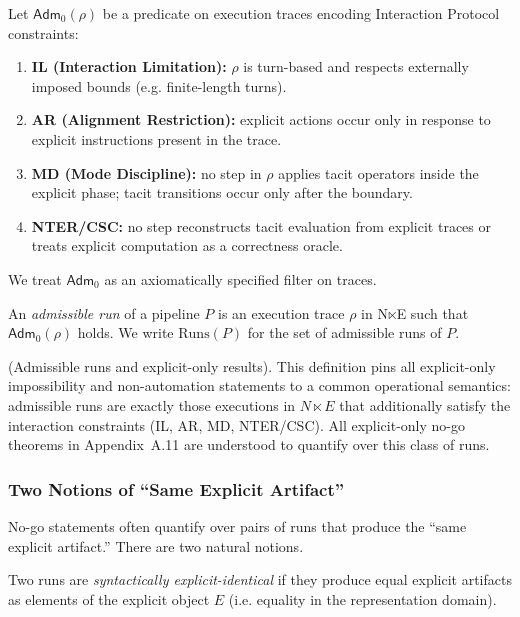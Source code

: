 \begin{definition}
Let $\mathsf{Adm}_0(\rho)$ be a predicate on execution traces encoding Interaction Protocol constraints:
\begin{enumerate}
  \item \textbf{IL (Interaction Limitation):} $\rho$ is turn-based and respects externally imposed bounds (e.g. finite-length turns).
  \item \textbf{AR (Alignment Restriction):} explicit actions occur only in response to explicit instructions present in the trace.
  \item \textbf{MD (Mode Discipline):} no step in $\rho$ applies tacit operators inside the explicit phase; tacit transitions occur only after the boundary.
  \item \textbf{NTER/CSC:} no step reconstructs tacit evaluation from explicit traces or treats explicit computation as a correctness oracle.
\end{enumerate}
We treat $\mathsf{Adm}_0$ as an axiomatically specified filter on traces.
\end{definition}

\begin{definition}
An \emph{admissible run} of a pipeline $P$ is an execution trace $\rho$ in N$\ltimes$E such that $\mathsf{Adm}_0(\rho)$ holds.
We write $\mathrm{Runs}(P)$ for the set of admissible runs of $P$.
\end{definition}

\begin{remark} (Admissible runs and explicit-only results).
This definition pins all explicit-only impossibility and non-automation statements to a common
operational semantics: admissible runs are exactly those executions in \(N \ltimes E\) that
additionally satisfy the interaction constraints (IL, AR, MD, NTER/CSC). All explicit-only
no-go theorems in Appendix~A.11 are understood to quantify over this class of runs.

\end{remark}

\subsubsection{Two Notions of ``Same Explicit Artifact''}
No-go statements often quantify over pairs of runs that produce the ``same explicit artifact.'' There are two natural notions.

\begin{definition}
Two runs are \emph{syntactically explicit-identical} if they produce equal explicit artifacts as elements of the explicit object $E$ (i.e. equality in the representation domain).
\end{definition}

